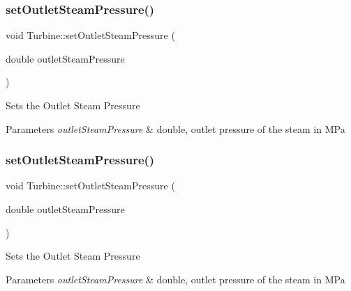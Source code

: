 \mbox{\label{class_turbine_ab9612657de02e4523492b687917b4091}} 
\subsubsection{\texorpdfstring{set\+Outlet\+Steam\+Pressure()}{setOutletSteamPressure()}\hspace{0.1cm}{\footnotesize\ttfamily [1/3]}}
{\footnotesize\ttfamily void Turbine\+::set\+Outlet\+Steam\+Pressure (\begin{DoxyParamCaption}\item[{double}]{outlet\+Steam\+Pressure }\end{DoxyParamCaption})}

Sets the Outlet Steam Pressure


\begin{DoxyParams}{Parameters}
{\em outlet\+Steam\+Pressure} & double, outlet pressure of the steam in M\+Pa \\
\hline
\end{DoxyParams}
\mbox{\label{class_turbine_ab9612657de02e4523492b687917b4091}} 
\subsubsection{\texorpdfstring{set\+Outlet\+Steam\+Pressure()}{setOutletSteamPressure()}\hspace{0.1cm}{\footnotesize\ttfamily [2/3]}}
{\footnotesize\ttfamily void Turbine\+::set\+Outlet\+Steam\+Pressure (\begin{DoxyParamCaption}\item[{double}]{outlet\+Steam\+Pressure }\end{DoxyParamCaption})}

Sets the Outlet Steam Pressure


\begin{DoxyParams}{Parameters}
{\em outlet\+Steam\+Pressure} & double, outlet pressure of the steam in M\+Pa \\
\hline
\end{DoxyParams}


